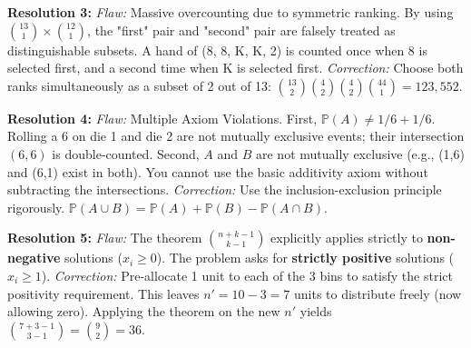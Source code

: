 \documentclass[11pt]{article}
\theoremstyle{definition}
\theoremstyle{plain}
\theoremstyle{remark}
\newcommand{\Prob}{\mathbb{P}}
\begin{document}
\textbf{Resolution 3:}
\textit{Flaw:} Massive overcounting due to symmetric ranking. By using $\binom{13}{1} \times \binom{12}{1}$, the "first" pair and "second" pair are falsely treated as distinguishable subsets. A hand of (8, 8, K, K, 2) is counted once when 8 is selected first, and a second time when K is selected first.
\textit{Correction:} Choose both ranks simultaneously as a subset of 2 out of 13: $\binom{13}{2} \binom{4}{2} \binom{4}{2} \binom{44}{1} = 123,552$.

\textbf{Resolution 4:}
\textit{Flaw:} Multiple Axiom Violations. First, $\Prob(A) \ne 1/6 + 1/6$. Rolling a 6 on die 1 and die 2 are not mutually exclusive events; their intersection $(6,6)$ is double-counted. Second, $A$ and $B$ are not mutually exclusive (e.g., (1,6) and (6,1) exist in both). You cannot use the basic additivity axiom without subtracting the intersections.
\textit{Correction:} Use the inclusion-exclusion principle rigorously. $\Prob(A \cup B) = \Prob(A) + \Prob(B) - \Prob(A \cap B)$.

\textbf{Resolution 5:}
\textit{Flaw:} The theorem $\binom{n+k-1}{k-1}$ explicitly applies strictly to \textbf{non-negative} solutions ($x_i \ge 0$). The problem asks for \textbf{strictly positive} solutions ($x_i \ge 1$). 
\textit{Correction:} Pre-allocate 1 unit to each of the 3 bins to satisfy the strict positivity requirement. This leaves $n' = 10 - 3 = 7$ units to distribute freely (now allowing zero). Applying the theorem on the new $n'$ yields $\binom{7+3-1}{3-1} = \binom{9}{2} = 36$.
\end{document}
